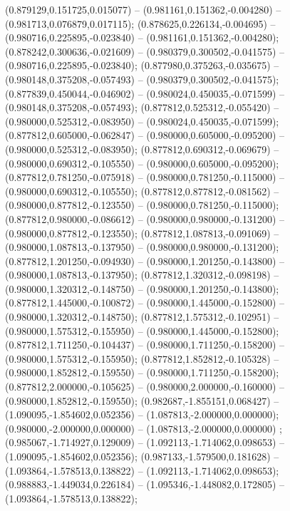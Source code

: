  (0.879129,0.151725,0.015077) -- (0.981161,0.151362,-0.004280) -- (0.981713,0.076879,0.017115);
 (0.878625,0.226134,-0.004695) -- (0.980716,0.225895,-0.023840) -- (0.981161,0.151362,-0.004280);
 (0.878242,0.300636,-0.021609) -- (0.980379,0.300502,-0.041575) -- (0.980716,0.225895,-0.023840);
 (0.877980,0.375263,-0.035675) -- (0.980148,0.375208,-0.057493) -- (0.980379,0.300502,-0.041575);
 (0.877839,0.450044,-0.046902) -- (0.980024,0.450035,-0.071599) -- (0.980148,0.375208,-0.057493);
 (0.877812,0.525312,-0.055420) -- (0.980000,0.525312,-0.083950) -- (0.980024,0.450035,-0.071599);
 (0.877812,0.605000,-0.062847) -- (0.980000,0.605000,-0.095200) -- (0.980000,0.525312,-0.083950);
 (0.877812,0.690312,-0.069679) -- (0.980000,0.690312,-0.105550) -- (0.980000,0.605000,-0.095200);
 (0.877812,0.781250,-0.075918) -- (0.980000,0.781250,-0.115000) -- (0.980000,0.690312,-0.105550);
 (0.877812,0.877812,-0.081562) -- (0.980000,0.877812,-0.123550) -- (0.980000,0.781250,-0.115000);
 (0.877812,0.980000,-0.086612) -- (0.980000,0.980000,-0.131200) -- (0.980000,0.877812,-0.123550);
 (0.877812,1.087813,-0.091069) -- (0.980000,1.087813,-0.137950) -- (0.980000,0.980000,-0.131200);
 (0.877812,1.201250,-0.094930) -- (0.980000,1.201250,-0.143800) -- (0.980000,1.087813,-0.137950);
 (0.877812,1.320312,-0.098198) -- (0.980000,1.320312,-0.148750) -- (0.980000,1.201250,-0.143800);
 (0.877812,1.445000,-0.100872) -- (0.980000,1.445000,-0.152800) -- (0.980000,1.320312,-0.148750);
 (0.877812,1.575312,-0.102951) -- (0.980000,1.575312,-0.155950) -- (0.980000,1.445000,-0.152800);
 (0.877812,1.711250,-0.104437) -- (0.980000,1.711250,-0.158200) -- (0.980000,1.575312,-0.155950);
 (0.877812,1.852812,-0.105328) -- (0.980000,1.852812,-0.159550) -- (0.980000,1.711250,-0.158200);
 (0.877812,2.000000,-0.105625) -- (0.980000,2.000000,-0.160000) -- (0.980000,1.852812,-0.159550);
 (0.982687,-1.855151,0.068427) -- (1.090095,-1.854602,0.052356) -- (1.087813,-2.000000,0.000000);
 (0.980000,-2.000000,0.000000) -- (1.087813,-2.000000,0.000000) ;
 (0.985067,-1.714927,0.129009) -- (1.092113,-1.714062,0.098653) -- (1.090095,-1.854602,0.052356);
 (0.987133,-1.579500,0.181628) -- (1.093864,-1.578513,0.138822) -- (1.092113,-1.714062,0.098653);
 (0.988883,-1.449034,0.226184) -- (1.095346,-1.448082,0.172805) -- (1.093864,-1.578513,0.138822);
